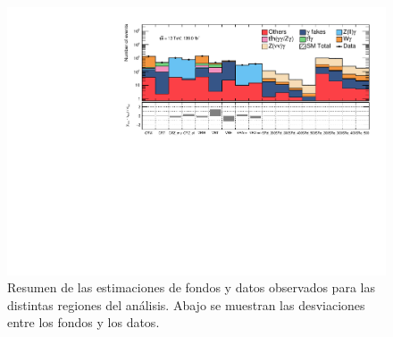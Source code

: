 \begin{figure}[ht!]
  \centering

    \includegraphics[width=\textwidth]{images/analysis_EWK/v192_2_nosyst/regions_pull.pdf}

    \caption{Resumen de las estimaciones de fondos y datos observados para las distintas regiones del análisis. Abajo se muestran las desviaciones entre los fondos y los datos.}
    \label{fig:pull_ewk}

\end{figure}



